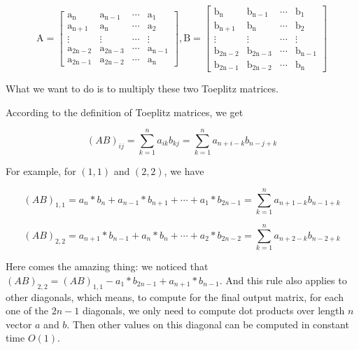 $$\mathrm{A}=\left[\begin{array}{cccc}{\mathrm{a}_{\mathrm{n}}} & {\mathrm{a}_{\mathrm{n}-1}} & {\cdots} & {\mathrm{a}_{1}} \\ {\mathrm{a}_{\mathrm{n+1}}} & {\mathrm{a}_{\mathrm{n}}} & {\cdots} & {\mathrm{a}_{2}} \\ {\vdots} & {\vdots} & {\cdots} & {\vdots} \\ {\mathrm{a}_{2\mathrm{n}-2}} & {\mathrm{a}_{2\mathrm{n}-3}} & {\cdots} & {\mathrm{a}_{\mathrm{n}-1}} \\ {\mathrm{a}_{2 \mathrm{n}-1}} & {\mathrm{a}_{2 \mathrm{n}-2}} & {\cdots} & {\mathrm{a}_{\mathrm{n}}}\end{array}\right], \mathrm{B}=\left[\begin{array}{cccc}{\mathrm{b}_{\mathrm{n}}} & {\mathrm{b}_{\mathrm{n}-1}} & {\cdots} & {\mathrm{b}_{1}} \\ {\mathrm{b}_{\mathrm{n+1}}} & {\mathrm{b}_{\mathrm{n}}} & {\cdots} & {\mathrm{b}_{2}} \\ {\vdots} & {\vdots} & {\cdots} & {\vdots} \\ {\mathrm{b}_{2\mathrm{n}-2}} & {\mathrm{b}_{2\mathrm{n}-3}} & {\cdots} & {\mathrm{b}_{\mathrm{n}-1}} \\ {\mathrm{b}_{2 \mathrm{n}-1}} & {\mathrm{b}_{2 \mathrm{n}-2}} & {\cdots} & {\mathrm{b}_{\mathrm{n}}}\end{array}\right]$$

What we want to do is to multiply these two Toeplitz matrices.

According to the definition of Toeplitz matrices,  we get

$$(AB)_{i j}=\sum_{k=1}^{n}{a_{i k}b_{k j}} = \sum_{k=1}^{n}{a_{n+i-k}b_{n-j+k}}$$

For example, for $(1,1)$ and $(2,2)$, we have

$$(AB)_{1,1}=a_n*b_n + a_{n-1}*b_{n+1} + \cdots + a_{1}*b_{2n-1}=\sum_{k=1}^{n}{a_{n+1-k}b_{n-1+k}}$$

$$(AB)_{2,2}=a_{n+1}*b_{n-1} + a_{n}*b_{n} + \cdots + a_{2}*b_{2n-2}=\sum_{k=1}^{n}{a_{n+2-k}b_{n-2+k}}$$

Here comes the amazing thing: we noticed that $(AB)_{2,2} = (AB)_{1,1}-a_{1}*b_{2n-1}+a_{n+1}*b_{n-1}$. And this rule also applies to other diagonals, which means, to compute for the final output matrix, for each one of the $2n-1$ diagonals, we only need to compute dot products over length $n$ vector $a$ and $b$. Then other values on this diagonal can be computed in constant time $O(1)$.

